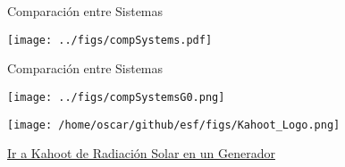 \documentclass[xcolor={usenames,svgnames,dvipsnames}]{beamer}
\begin{document}
\begin{frame}[label={sec:org76f5f24}]{Comparación entre Sistemas}
\begin{center}
\texttt{[image: ../figs/compSystems.pdf]}
\end{center}
\end{frame}

\begin{frame}[label={sec:org9531184}]{Comparación entre Sistemas}
\begin{center}
\texttt{[image: ../figs/compSystemsG0.png]}
\end{center}
\end{frame}


\begin{frame}[label={sec:org971acef}]{}
\begin{center}
\texttt{[image: /home/oscar/github/esf/figs/Kahoot\_Logo.png]}
\end{center}

\href{https://play.kahoot.it/v2/?quizId=29a16906-539a-4e29-b68c-fe6c9141ef02}{Ir a Kahoot de Radiación Solar en un Generador}
\end{frame}
\end{document}
